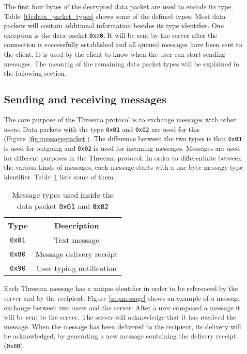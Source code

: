 \documentclass[11pt,a4paper,bookmarksopen=true]{article}
\begin{document}
The first four bytes of the decrypted data packet are used to encode
its type.  Table~\ref{tb:data_packet_types} shows some of the defined
types.
Most data packets will contain additional information besides its type identifier.
One exception is the data packet \texttt{0xd0}. It will be sent by the server after the
connection is successfully established and all queued messages have been sent to the client.
It is used by the client to know when the user can start sending messages. The meaning of the
remaining data packet types will be explained in the following section.

\subsection{Sending and receiving messages}\label{sec:messages}

The core purpose of the Threema protocol is to exchange messages with
other users. Data packets with the type \texttt{0x01} and \texttt{0x02} are used for this
(Figure~\ref{fig:message-packet}). The difference between the two
types is that \texttt{0x01} is used for outgoing and \texttt{0x02} is used for incoming
messages. Messages are used for different purposes in the Threema
protocol. In order to differentiate between the various kinds of
messages, each message starts with a one byte message type
identifier.  Table~\ref{tb:message_types} lists some of them.

\begin{table}[h]
  \centering
  \begin{tabular}{|c |c|}
    \hline
    Type          & Description              \\ \hline
    \texttt{0x01} & Text message             \\ \hline
    \texttt{0x80} & Message delivery receipt \\ \hline
    \texttt{0x90} & User typing notification \\ \hline
  \end{tabular}
  \caption{Message types used inside the data packet \texttt{0x01} and \texttt{0x02}}
  \label{tb:message_types}
\end{table}

Each Threema message has a unique identifier in order to be referenced
by the server and by the recipient.  Figure \ref{seqmessage} shows an
example of a message exchange between two users and the server: After
a user composed a message it will be sent to the server. The server will
acknowledge that it has received the message.  When the message has
been delivered to the recipient, its delivery will be acknowledged,
by generating a new message containing the delivery receipt (\texttt{0x80}).
\end{document}
